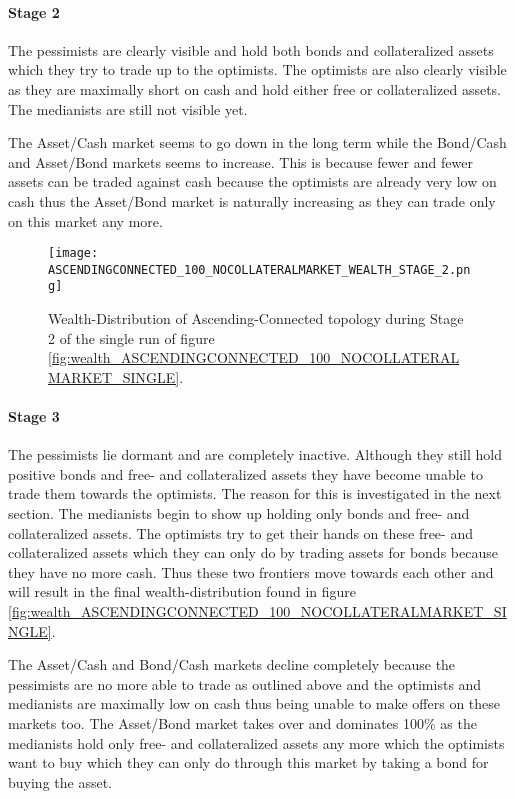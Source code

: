\documentclass[Bachelorarbeit.tex]{subfiles}
\begin{document}
\paragraph{Stage 2}
The pessimists are clearly visible and hold both bonds and collateralized assets which they try to trade up to the optimists. The optimists are also clearly visible as  they are maximally short on cash and hold either free or collateralized assets. The medianists are still not visible yet.

\medskip

The Asset/Cash market seems to go down in the long term while the Bond/Cash and Asset/Bond markets seems to increase. This is because fewer and fewer assets can be traded against cash because the optimists are already very low on cash thus the Asset/Bond market is naturally increasing as they can trade only on this market any more.

\begin{figure}[H]
	\centering
  \texttt{[image: ASCENDINGCONNECTED\_100\_NOCOLLATERALMARKET\_WEALTH\_STAGE\_2.png]}
  	\caption{Wealth-Distribution of Ascending-Connected topology during Stage 2 of the single run of figure \ref{fig:wealth_ASCENDINGCONNECTED_100_NOCOLLATERALMARKET_SINGLE}.}
	\label{fig:markets_ASCENDINGCONNECTED_100_NOCOLLATERALMARKET_WEALTH_STAGE_2}
\end{figure}
		
\paragraph{Stage 3}
The pessimists lie dormant and are completely inactive. Although they still hold positive bonds and free- and collateralized assets they have become unable to trade them towards the optimists. The reason for this is investigated in the next section. The medianists begin to show up holding only bonds and free- and collateralized assets. The optimists try to get their hands on these free- and collateralized assets which they can only do by trading assets for bonds because they have no more cash. Thus these two frontiers move towards each other and will result in the final wealth-distribution found in figure \ref{fig:wealth_ASCENDINGCONNECTED_100_NOCOLLATERALMARKET_SINGLE}.

\medskip

The Asset/Cash and Bond/Cash markets decline completely because the pessimists are no more able to trade as outlined above and the optimists and medianists are maximally low on cash thus being unable to make offers on these markets too. The Asset/Bond market takes over and dominates 100\% as the medianists hold only free- and collateralized assets any more which the optimists want to buy which they can only do through this market by taking a bond for buying the asset.
\end{document}
